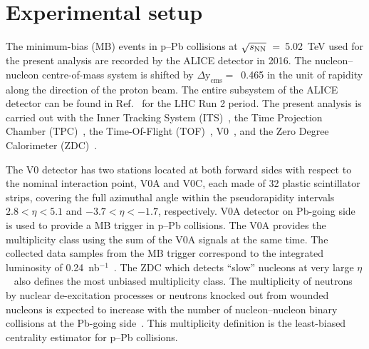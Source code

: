 \section{Experimental setup}
\label{sec:setup}
The minimum-bias (MB) events in p--Pb collisions at $\sqrt{s_{\rm NN}}$~=~5.02~TeV used for the present analysis are recorded by the ALICE detector in 2016. The nucleon–nucleon centre-of-mass system is shifted by $\Delta \mathrm{y}_{\mathrm{cms}} =$~0.465 in the unit of rapidity along the direction of the proton beam. The entire subsystem of the ALICE detector can be found in Ref.~\cite{Abelev:2014ffa} for the LHC Run 2 period. The present analysis is carried out with the Inner Tracking System (ITS)~\cite{ALICE:2010tia}, the Time Projection Chamber (TPC)~\cite{Alme:2010ke}, the Time-Of-Flight (TOF)~\cite{Jacazio:2018slq}, V0~\cite{ALICE:2013axi}, and the Zero Degree Calorimeter (ZDC)~\cite{Cortese:2019nnv}. 

The V0 detector has two stations located at both forward sides with respect to the nominal interaction point, V0A and V0C, each made of 32 plastic scintillator strips, covering the full azimuthal angle within the pseudorapidity intervals $2.8 < \eta < 5.1$ and $-3.7 < \eta < -1.7$, respectively. V0A detector on Pb-going side is used to provide a MB trigger in p--Pb collisions. The V0A provides the multiplicity class using the sum of the V0A signals at the same time. The collected data samples from the MB trigger correspond to the integrated luminosity of 0.24~nb$^{-1}$~\cite{ALICE:2014gvw}. The ZDC which detects ``slow'' nucleons at very large $\eta$~\cite{Cortese:2019nnv} also defines the most unbiased multiplicity class. The multiplicity of neutrons by nuclear de-excitation processes or neutrons knocked out from wounded nucleons is expected to increase with the number of nucleon–nucleon binary collisions at the Pb-going side~\cite{ALICE:2014xsp}. This multiplicity definition is the least-biased centrality estimator for p--Pb collisions.


